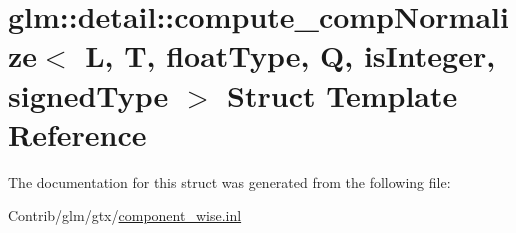\hypertarget{structglm_1_1detail_1_1compute__comp_normalize}{}\section{glm\+:\+:detail\+:\+:compute\+\_\+comp\+Normalize$<$ L, T, float\+Type, Q, is\+Integer, signed\+Type $>$ Struct Template Reference}
\label{structglm_1_1detail_1_1compute__comp_normalize}


The documentation for this struct was generated from the following file\+:\begin{DoxyCompactItemize}
\item 
Contrib/glm/gtx/\mbox{\hyperlink{component__wise_8inl}{component\+\_\+wise.\+inl}}\end{DoxyCompactItemize}
